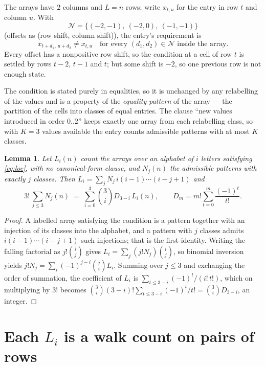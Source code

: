 \documentclass[11pt,a4paper]{article}
\theoremstyle{plain}
\newtheorem{lemma}[theorem]{Lemma}
\theoremstyle{definition}
\begin{document}
The arrays have $2$ columns and $L=n$ rows; write $x_{t,u}$ for the entry in
row $t$ and column $u$. With
\[
\mathcal N=\{(-2,-1),\ (-2,0),\ (-1,-1)\}
\]
(offsets as (row shift, column shift)), the entry's requirement is
\begin{equation}\label{eq:loc}
x_{t+d_1,\,u+d_2}\ne x_{t,u}\quad\text{for every }(d_1,d_2)\in\mathcal N\text{ inside the array}.
\end{equation}
Every offset has a nonpositive row shift, so the condition at a cell of row $t$ is
settled by rows $t-2$, $t-1$ and $t$; but some shift is $-2$, so one previous row is not
enough state.

The condition is stated purely in equalities, so it is unchanged by any relabelling of the
values and is a property of the \emph{equality pattern} of the array --- the partition of
the cells into classes of equal entries. The clause ``new values introduced in order
$0..2$'' keeps exactly one array from each relabelling class, so with $K=3$ values
available the entry counts admissible patterns with at most $K$ classes.

\begin{lemma}\label{lem:inv}
Let $L_i(n)$ count the arrays over an alphabet of $i$ letters satisfying \eqref{eq:loc},
with no canonical-form clause, and $N_j(n)$ the admissible patterns with exactly $j$ classes.
Then $L_i=\sum_j N_j\,i(i-1)\cdots(i-j+1)$ and
\[
3!\,\sum_{j\le 3}N_j(n)\;=\;\sum_{i=0}^{3}\binom{3}{i}D_{3-i}\,L_i(n),
\qquad D_m=m!\sum_{t=0}^{m}\frac{(-1)^t}{t!} .
\]
\end{lemma}

\begin{proof}
A labelled array satisfying the condition is a pattern together with an injection of its
classes into the alphabet, and a pattern with $j$ classes admits $i(i-1)\cdots(i-j+1)$ such
injections; that is the first identity. Writing the falling factorial as $j!\binom{i}{j}$
gives $L_i=\sum_j(j!N_j)\binom{i}{j}$, so binomial inversion yields
$j!N_j=\sum_i(-1)^{j-i}\binom{j}{i}L_i$. Summing over $j\le3$ and exchanging the
order of summation, the coefficient of $L_i$ is $\sum_{t\le3-i}(-1)^t/(i!\,t!)$, which on
multiplying by $3!$ becomes
$\binom{3}{i}(3-i)!\sum_{t\le3-i}(-1)^t/t!=\binom{3}{i}D_{3-i}$, an
integer.
\end{proof}

\section{Each $L_i$ is a walk count on pairs of rows}
\end{document}

